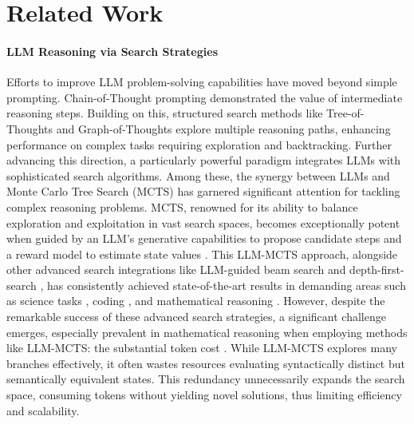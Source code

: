 \documentclass[11pt]{article}
\begin{document}
\section{Related Work}
\paragraph{LLM Reasoning via Search Strategies}
Efforts to improve LLM problem-solving capabilities have moved beyond simple prompting. Chain-of-Thought prompting \citep{wei2022chain} demonstrated the value of intermediate reasoning steps. Building on this, structured search methods like Tree-of-Thoughts \citep{yao2023tree} and Graph-of-Thoughts \citep{besta2024graph} explore multiple reasoning paths, enhancing performance on complex tasks requiring exploration and backtracking.
Further advancing this direction, a particularly powerful paradigm integrates LLMs with sophisticated search algorithms. Among these, the synergy between LLMs and Monte Carlo Tree Search (MCTS) \citep{chenalphamath,zhang2024rest} has garnered significant attention for tackling complex reasoning problems.
MCTS, renowned for its ability to balance exploration and exploitation in vast search spaces, becomes exceptionally potent when guided by an LLM's generative capabilities to propose candidate steps and a reward model to estimate state values \citep{yao2023tree,long2023large,besta2024graph}. This LLM-MCTS approach, alongside other advanced search integrations like LLM-guided beam search \citep{chenalphamath} and depth-first-search \citep{yao2023tree}, has consistently achieved state-of-the-art results in demanding areas such as science tasks \citep{yang2024qwen2}, coding \citep{dainesegenerating,zhangplanning}, and mathematical reasoning \citep{zhang2024llama, luo2024improve}.
However, despite the remarkable success of these advanced search strategies, a significant challenge emerges, especially prevalent in mathematical reasoning when employing methods like LLM-MCTS: the substantial token cost \citep{chenalphamath}. While LLM-MCTS explores many branches effectively, it often wastes resources evaluating syntactically distinct but semantically equivalent states. This redundancy unnecessarily expands the search space, consuming tokens without yielding novel solutions, thus limiting efficiency and scalability.
\end{document}
